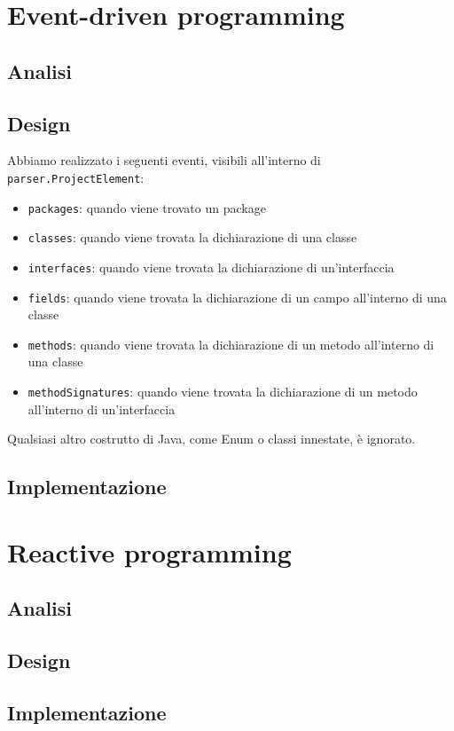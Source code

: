 \documentclass[12pt,a4paper,oneside]{article}
\begin{document}
	\section{Event-driven programming}
	\subsection{Analisi}
	\subsection{Design}
	Abbiamo realizzato i seguenti eventi, visibili all'interno di \texttt{parser.ProjectElement}:
	\begin{itemize}
		\item \texttt{packages}: quando viene trovato un package
		\item \texttt{classes}: quando viene trovata la dichiarazione di una classe
		\item \texttt{interfaces}: quando viene trovata la dichiarazione di un'interfaccia
		\item \texttt{fields}: quando viene trovata la dichiarazione di un campo all'interno di una classe
		\item \texttt{methods}: quando viene trovata la dichiarazione di un metodo all'interno di una classe
		\item \texttt{methodSignatures}: quando viene trovata la dichiarazione di un metodo all'interno di un'interfaccia
	\end{itemize}
	Qualsiasi altro costrutto di Java, come Enum o classi innestate, è ignorato.
	\subsection{Implementazione}
	
	
	\section{Reactive programming}
	\subsection{Analisi}
	\subsection{Design}
	\subsection{Implementazione}
\end{document}
